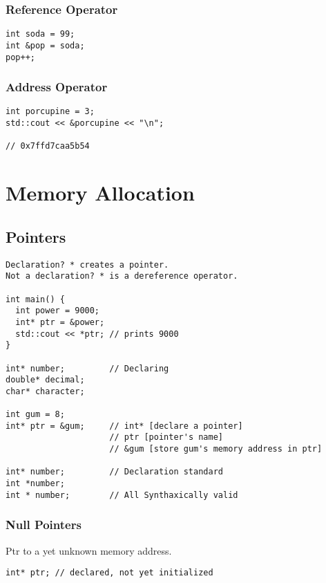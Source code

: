 \subsection{Reference Operator}

\begin{verbatim}
int soda = 99; 
int &pop = soda;
pop++;
\end{verbatim}

\subsection{Address Operator}

\begin{verbatim}
int porcupine = 3; 
std::cout << &porcupine << "\n"; 

// 0x7ffd7caa5b54
\end{verbatim}

\chapter{Memory Allocation}
\section{Pointers}

\begin{verbatim}
Declaration? * creates a pointer.
Not a declaration? * is a dereference operator.

int main() {
  int power = 9000;
  int* ptr = &power;
  std::cout << *ptr; // prints 9000
}

int* number;         // Declaring
double* decimal;
char* character;

int gum = 8;
int* ptr = &gum;     // int* [declare a pointer]
                     // ptr [pointer's name]
                     // &gum [store gum's memory address in ptr]

int* number;         // Declaration standard
int *number;
int * number;        // All Synthaxically valid

\end{verbatim}

\subsection{Null Pointers}

Ptr to a yet unknown memory address.

\begin{verbatim}
int* ptr; // declared, not yet initialized
\end{verbatim}

